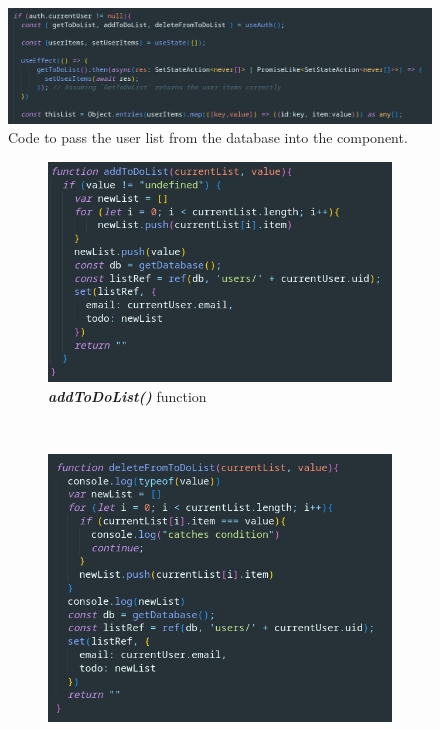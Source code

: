 \documentclass{l4proj}
\begin{document}
\begin{figure}[ht]
    \centering
    \includegraphics[width=0.9\linewidth]{images/userToDo.pdf}    

    \caption{Code to pass the user list from the database into the component.
    }

    \label{fig:userToDo} 
\end{figure}

\begin{figure}[ht]
    \centering
    \begin{subfigure}[b]{0.48\textwidth}
        \includegraphics[width=\textwidth]{images/addItem.pdf}
        \caption{\textbf{\textit{addToDoList()}} function}
        \label{fig:toggleRow}
    \end{subfigure}
    ~ %
    \begin{subfigure}[b]{0.48\textwidth}
        \includegraphics[width=\textwidth]{images/deleteItem.pdf}

\end{subfigure}
\end{figure}
\end{document}
